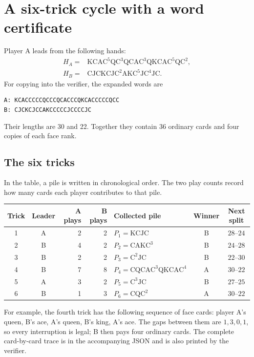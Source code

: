 \documentclass[11pt]{article}
\newcommand{\CC}{\mathrm C}
\newcommand{\JJ}{\mathrm J}
\newcommand{\QQ}{\mathrm Q}
\newcommand{\KK}{\mathrm K}
\renewcommand{\AA}{\mathrm A}
\begin{document}
\section{A six-trick cycle with a word certificate}\label{sec:witness}

Player A leads from the following hands:
\[
\begin{aligned}
H_A={}&\KK\CC\AA\CC^5\QQ\CC^3\QQ\CC\AA\CC^3\QQ
        \KK\CC\AA\CC^5\QQ\CC^2,\\
H_B={}&\CC\JJ\CC\KK\CC\JJ\CC^2\AA\KK\CC^5\JJ\CC^4\JJ\CC.
\end{aligned}
\]
For copying into the verifier, the expanded words are
\begin{verbatim}
A: KCACCCCCQCCCQCACCCQKCACCCCCQCC
B: CJCKCJCCAKCCCCCJCCCCJC
\end{verbatim}
Their lengths are 30 and 22. Together they contain 36 ordinary cards and four
copies of each face rank.

\subsection{The six tricks}

In the table, a pile is written in chronological order. The two play counts
record how many cards each player contributes to that pile.
\begin{center}
\small
\begin{tabular}{@{}c c r r l c c@{}}
\toprule
Trick & Leader & A plays & B plays & Collected pile & Winner & Next split\\
\midrule
1&A&2&2&$P_1=\KK\CC\JJ\CC$&B&$28$--$24$\\
2&B&4&2&$P_2=\CC\AA\KK\CC^3$&B&$24$--$28$\\
3&B&2&2&$P_3=\CC^2\JJ\CC$&B&$22$--$30$\\
4&B&7&8&$P_4=\CC\QQ\CC\AA\CC^3\QQ\KK\CC\AA\CC^4$&A&$30$--$22$\\
5&A&3&2&$P_5=\CC^3\JJ\CC$&B&$27$--$25$\\
6&B&1&3&$P_6=\CC\QQ\CC^2$&A&$30$--$22$\\
\bottomrule
\end{tabular}
\end{center}

For example, the fourth trick has the following sequence of face cards:
player A's queen, B's ace, A's queen, B's king, A's ace. The gaps between
them are $1,3,0,1$, so every interruption is legal; B then pays four ordinary
cards. The complete card-by-card trace is in the accompanying JSON and is
also printed by the verifier.
\end{document}
